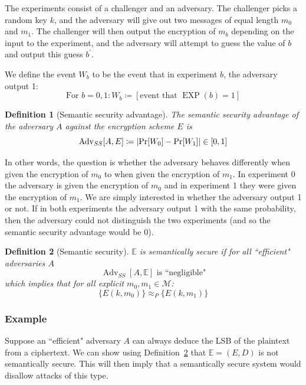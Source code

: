 \documentclass[10pt,a4paper]{report}
\newtheorem{definition}{Definition}[section]
\begin{document}
The experiments consist of a challenger and an adversary. The challenger picks a random key $k$,
and the adversary will give out two messages of equal length $m_0$ and $m_1$. The challenger will
then output the encryption of $m_b$ depending on the input to the experiment, and the adversary
will attempt to guess the value of $b$ and output this guess $b^\prime$.

We define the event $W_b$ to be the event that in experiment $b$, the adversary output 1:
$$ \text{For } b = 0, 1 \colon W_b \coloneqq [\text{event that } \operatorname{EXP}(b) = 1] $$

\begin{definition}[Semantic security advantage]
    The semantic security advantage of the adversary $A$ against the encryption scheme $E$ is
        $$ \operatorname{Adv}_{SS}[A, E] \coloneqq \abs{\operatorname{Pr}[W_0] -
           \operatorname{Pr}[W_1]} \in [0, 1] $$
\end{definition}

In other words, the question is whether the adversary behaves differently when given the encryption
of $m_0$ to when given the encryption of $m_1$. In experiment 0 the adversary is given the
encryption of $m_0$ and in experiment 1 they were given the encryption of $m_1$. We are simply
interested in whether the adversary output 1 or not. If in both experiments the adversary output 1
with the same probability, then the adversary could not distinguish the two experiments (and so the
semantic security advantage would be 0).

\begin{definition}[Semantic security]
    $\mathbb{E}$ is semantically secure if for all ``efficient" adversaries $A$
        $$ \operatorname{Adv}_{SS}[A, \mathbb{E}] \text{ is ``negligible"} $$
    which implies that for all explicit $m_0, m_1 \in \mathcal{M}$:
        $$ \{E(k, m_0)\} \approx_P \{E(k, m_1)\} $$
    \label{def:semantic_security}
\end{definition}

\subsubsection*{Example}

Suppose an ``efficient" adversary $A$ can always deduce the LSB of the plaintext from a ciphertext.
We can show using Definition~\ref{def:semantic_security} that $\mathbb{E} = (E, D)$ is not
semantically secure. This will then imply that a semantically secure system would disallow attacks
of this type.
\end{document}
